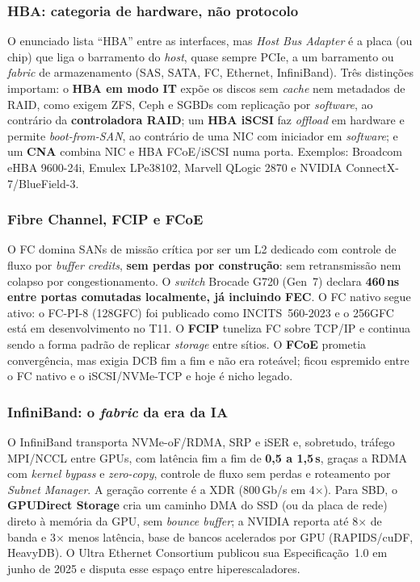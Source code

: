 \documentclass[11pt,a4paper]{article}
\newcommand{\us}{\,\textmu s}
\begin{document}
\subsubsection*{HBA: categoria de hardware, não protocolo}

O enunciado lista ``HBA'' entre as interfaces, mas \emph{Host Bus Adapter} é a placa (ou chip)
que liga o barramento do \emph{host}, quase sempre PCIe, a um barramento ou \emph{fabric} de
armazenamento (SAS, SATA, FC, Ethernet, InfiniBand). Três distinções importam: o \textbf{HBA
em modo IT} expõe os discos sem \emph{cache} nem metadados de RAID, como exigem ZFS, Ceph e
SGBDs com replicação por \emph{software}, ao contrário da \textbf{controladora RAID}; um
\textbf{HBA iSCSI} faz \emph{offload} em hardware e permite \emph{boot-from-SAN}, ao contrário
de uma NIC com iniciador em \emph{software}; e um \textbf{CNA} combina NIC e HBA FCoE/iSCSI
numa porta. Exemplos: Broadcom eHBA 9600-24i, Emulex LPe38102, Marvell QLogic 2870 e NVIDIA
ConnectX-7/BlueField-3.

\subsubsection*{Fibre Channel, FCIP e FCoE}

O FC domina SANs de missão crítica por ser um L2 dedicado com controle de fluxo por
\emph{buffer credits}, \textbf{sem perdas por construção}: sem retransmissão nem colapso por
congestionamento. O \emph{switch} Brocade G720 (Gen~7) declara \textbf{460\,ns entre portas
comutadas localmente, já incluindo FEC}. O FC nativo segue ativo: o FC-PI-8 (128GFC) foi
publicado como INCITS~560-2023 e o 256GFC está em desenvolvimento no T11. O \textbf{FCIP}
tuneliza FC sobre TCP/IP e continua sendo a forma padrão de replicar \emph{storage} entre
sítios. O \textbf{FCoE} prometia convergência, mas exigia DCB fim a fim e não era roteável;
ficou espremido entre o FC nativo e o iSCSI/NVMe-TCP e hoje é nicho legado.

\subsubsection*{InfiniBand: o \emph{fabric} da era da IA}

O InfiniBand transporta NVMe-oF/RDMA, SRP e iSER e, sobretudo, tráfego MPI/NCCL entre GPUs,
com latência fim a fim de \textbf{0,5 a 1,5\us}, graças a RDMA com \emph{kernel bypass} e
\emph{zero-copy}, controle de fluxo sem perdas e roteamento por \emph{Subnet Manager}. A
geração corrente é a XDR (800\,Gb/s em 4$\times$). Para SBD, o \textbf{GPUDirect Storage} cria
um caminho DMA do SSD (ou da placa de rede) direto à memória da GPU, sem \emph{bounce buffer};
a NVIDIA reporta até 8$\times$ de banda e 3$\times$ menos latência, base de bancos acelerados
por GPU (RAPIDS/cuDF, HeavyDB). O Ultra Ethernet Consortium publicou sua Especificação~1.0 em
junho de 2025 e disputa esse espaço entre hiperescaladores.
\end{document}
